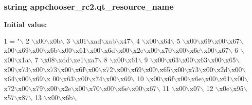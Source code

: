 \subsubsection[{qt\+\_\+resource\+\_\+name}]{\setlength{\rightskip}{0pt plus 5cm}string appchooser\+\_\+rc2.\+qt\+\_\+resource\+\_\+name}\label{namespaceappchooser__rc2_a7a3f12a3a94a3cac990aa0c12ea6a992}
{\bfseries Initial value\+:}
\begin{DoxyCode}
1 = \textcolor{stringliteral}{"\(\backslash\)}
2 \textcolor{stringliteral}{\(\backslash\)x00\(\backslash\)x0b\(\backslash\)}
3 \textcolor{stringliteral}{\(\backslash\)x01\(\backslash\)xad\(\backslash\)xab\(\backslash\)x47\(\backslash\)}
4 \textcolor{stringliteral}{\(\backslash\)x00\(\backslash\)x64\(\backslash\)}
5 \textcolor{stringliteral}{\(\backslash\)x00\(\backslash\)x69\(\backslash\)x00\(\backslash\)x67\(\backslash\)x00\(\backslash\)x69\(\backslash\)x00\(\backslash\)x6b\(\backslash\)x00\(\backslash\)x61\(\backslash\)x00\(\backslash\)x6d\(\backslash\)x00\(\backslash\)x2e\(\backslash\)x00\(\backslash\)x70\(\backslash\)x00\(\backslash\)x6e\(\backslash\)x00\(\backslash\)x67\(\backslash\)}
6 \textcolor{stringliteral}{\(\backslash\)x00\(\backslash\)x1a\(\backslash\)}
7 \textcolor{stringliteral}{\(\backslash\)x08\(\backslash\)xdd\(\backslash\)xe1\(\backslash\)xa7\(\backslash\)}
8 \textcolor{stringliteral}{\(\backslash\)x00\(\backslash\)x61\(\backslash\)}
9 \textcolor{stringliteral}{\(\backslash\)x00\(\backslash\)x63\(\backslash\)x00\(\backslash\)x63\(\backslash\)x00\(\backslash\)x65\(\backslash\)x00\(\backslash\)x73\(\backslash\)x00\(\backslash\)x73\(\backslash\)x00\(\backslash\)x6f\(\backslash\)x00\(\backslash\)x72\(\backslash\)x00\(\backslash\)x69\(\backslash\)x00\(\backslash\)x65\(\backslash\)x00\(\backslash\)x73\(\backslash\)x00\(\backslash\)x2d\(\backslash\)x00\(\backslash\)x64\(\backslash\)x00\(\backslash\)x69\(\backslash\)x
      00\(\backslash\)x63\(\backslash\)x00\(\backslash\)x74\(\backslash\)x00\(\backslash\)x69\(\backslash\)}
10 \textcolor{stringliteral}{\(\backslash\)x00\(\backslash\)x6f\(\backslash\)x00\(\backslash\)x6e\(\backslash\)x00\(\backslash\)x61\(\backslash\)x00\(\backslash\)x72\(\backslash\)x00\(\backslash\)x79\(\backslash\)x00\(\backslash\)x2e\(\backslash\)x00\(\backslash\)x70\(\backslash\)x00\(\backslash\)x6e\(\backslash\)x00\(\backslash\)x67\(\backslash\)}
11 \textcolor{stringliteral}{\(\backslash\)x00\(\backslash\)x07\(\backslash\)}
12 \textcolor{stringliteral}{\(\backslash\)x0e\(\backslash\)x95\(\backslash\)x57\(\backslash\)x87\(\backslash\)}
13 \textcolor{stringliteral}{\(\backslash\)x00\(\backslash\)x6b\(\backslash\)}

\end{DoxyCode}
